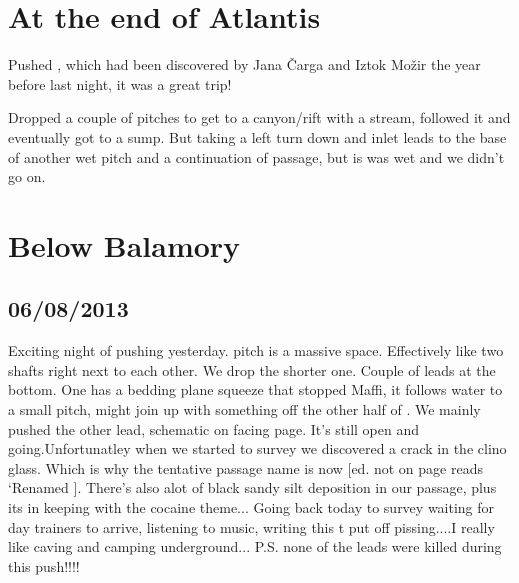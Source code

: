 \section{At the end of Atlantis} 
    
Pushed , which had been discovered by Jana Čarga and Iztok Možir the year before last night, it was a great trip!

Dropped a couple of pitches to get to a canyon/rift with a stream, followed it and eventually got to a sump. But taking a left turn down and inlet leads to the base of another wet pitch and a continuation of passage, but is was wet and we didn't go on. 


\section{Below Balamory}

    
\subsection{06/08/2013}
Exciting night of pushing yesterday.  pitch is a massive space. Effectively like two shafts right next to each other. We drop the shorter one. Couple of leads at the bottom. One has a bedding plane squeeze that stopped Maffi, it follows water to a small pitch, might join up with something off the other half of .
We mainly pushed the other lead, schematic on facing page. It's still open and going.Unfortunatley when we started to survey we discovered a crack in the clino glass. Which is why the tentative passage name is now  [ed. not on page reads `Renamed ]. There's also alot of black sandy silt deposition in our passage, plus its in keeping with the cocaine theme...
Going back today to survey waiting for day trainers to arrive, listening to music, writing this t put off pissing....I really like caving and camping underground...
P.S. none of the leads were killed during this push!!!!

